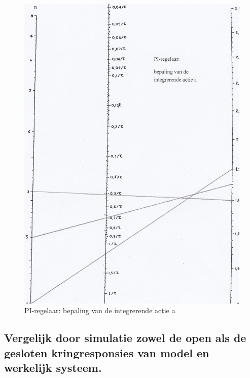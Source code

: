 \documentclass[a4paper, 12pt]{article}
\begin{document}
\begin{figure}[H]
	\includegraphics[width=1\linewidth]{Labo2_2_3.jpg}
	\caption{PI-regelaar: bepaling van de integrerende actie a}
	\label{fig:fig2_2_3}
\end{figure}

\subsection{Vergelijk door simulatie zowel de open als de gesloten kringresponsies van model en werkelijk systeem.}
\end{document}
